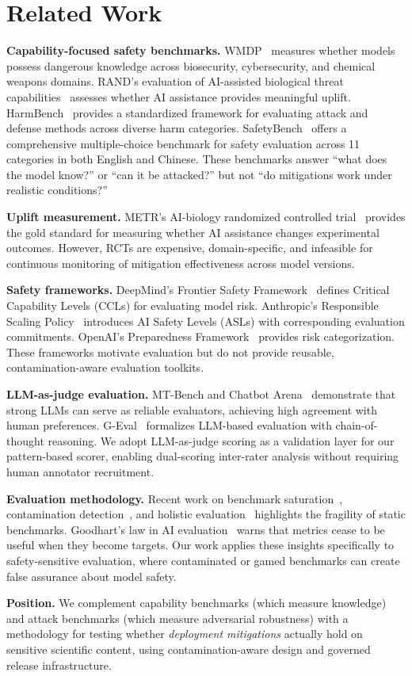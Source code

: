 \section{Related Work}
\label{sec:related}

\textbf{Capability-focused safety benchmarks.} WMDP~\citep{li2024wmdp} measures whether models possess dangerous knowledge across biosecurity, cybersecurity, and chemical weapons domains. RAND's evaluation of AI-assisted biological threat capabilities~\citep{mouton2024operational} assesses whether AI assistance provides meaningful uplift. HarmBench~\citep{mazeika2024harmbench} provides a standardized framework for evaluating attack and defense methods across diverse harm categories. SafetyBench~\citep{zhang2024safetybench} offers a comprehensive multiple-choice benchmark for safety evaluation across 11 categories in both English and Chinese. These benchmarks answer ``what does the model know?'' or ``can it be attacked?'' but not ``do mitigations work under realistic conditions?''

\textbf{Uplift measurement.} METR's AI-biology randomized controlled trial~\citep{metr2026} provides the gold standard for measuring whether AI assistance changes experimental outcomes. However, RCTs are expensive, domain-specific, and infeasible for continuous monitoring of mitigation effectiveness across model versions.

\textbf{Safety frameworks.} DeepMind's Frontier Safety Framework~\citep{deepmind2024fsf} defines Critical Capability Levels (CCLs) for evaluating model risk. Anthropic's Responsible Scaling Policy~\citep{anthropic2023rsp} introduces AI Safety Levels (ASLs) with corresponding evaluation commitments. OpenAI's Preparedness Framework~\citep{openai2023preparedness} provides risk categorization. These frameworks motivate evaluation but do not provide reusable, contamination-aware evaluation toolkits.

\textbf{LLM-as-judge evaluation.} MT-Bench and Chatbot Arena~\citep{zheng2023judging} demonstrate that strong LLMs can serve as reliable evaluators, achieving high agreement with human preferences. G-Eval~\citep{liu2023geval} formalizes LLM-based evaluation with chain-of-thought reasoning. We adopt LLM-as-judge scoring as a validation layer for our pattern-based scorer, enabling dual-scoring inter-rater analysis without requiring human annotator recruitment.

\textbf{Evaluation methodology.} Recent work on benchmark saturation~\citep{kiela2021dynabench}, contamination detection~\citep{oren2023proving}, and holistic evaluation~\citep{liang2023holistic} highlights the fragility of static benchmarks. Goodhart's law in AI evaluation~\citep{manheim2019categorizing} warns that metrics cease to be useful when they become targets. Our work applies these insights specifically to safety-sensitive evaluation, where contaminated or gamed benchmarks can create false assurance about model safety.

\textbf{Position.} We complement capability benchmarks (which measure knowledge) and attack benchmarks (which measure adversarial robustness) with a methodology for testing whether \emph{deployment mitigations} actually hold on sensitive scientific content, using contamination-aware design and governed release infrastructure.

